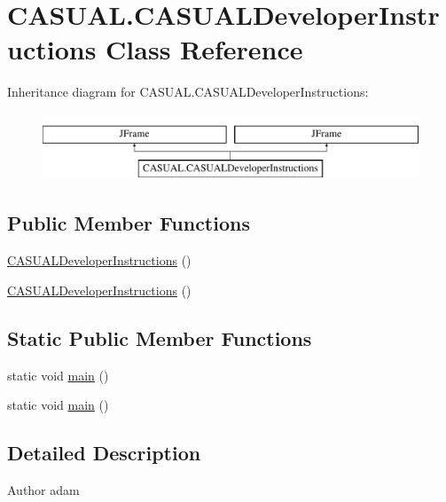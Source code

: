 \hypertarget{classCASUAL_1_1CASUALDeveloperInstructions}{\section{C\-A\-S\-U\-A\-L.\-C\-A\-S\-U\-A\-L\-Developer\-Instructions Class Reference}
\label{classCASUAL_1_1CASUALDeveloperInstructions}
}
Inheritance diagram for C\-A\-S\-U\-A\-L.\-C\-A\-S\-U\-A\-L\-Developer\-Instructions\-:\begin{figure}[H]
\begin{center}
\leavevmode
\includegraphics[height=2.000000cm]{classCASUAL_1_1CASUALDeveloperInstructions}
\end{center}
\end{figure}
\subsection*{Public Member Functions}
\begin{DoxyCompactItemize}
\item 
\hyperlink{classCASUAL_1_1CASUALDeveloperInstructions_a7ddef8688a60e51e7b1ce848d250287c}{C\-A\-S\-U\-A\-L\-Developer\-Instructions} ()
\item 
\hyperlink{classCASUAL_1_1CASUALDeveloperInstructions_a7ddef8688a60e51e7b1ce848d250287c}{C\-A\-S\-U\-A\-L\-Developer\-Instructions} ()
\end{DoxyCompactItemize}
\subsection*{Static Public Member Functions}
\begin{DoxyCompactItemize}
\item 
static void \hyperlink{classCASUAL_1_1CASUALDeveloperInstructions_a9fdc7d5a093dd16664125cd09de3da77}{main} ()
\item 
static void \hyperlink{classCASUAL_1_1CASUALDeveloperInstructions_a9fdc7d5a093dd16664125cd09de3da77}{main} ()
\end{DoxyCompactItemize}


\subsection{Detailed Description}
\begin{DoxyAuthor}{Author}
adam 
\end{DoxyAuthor}


